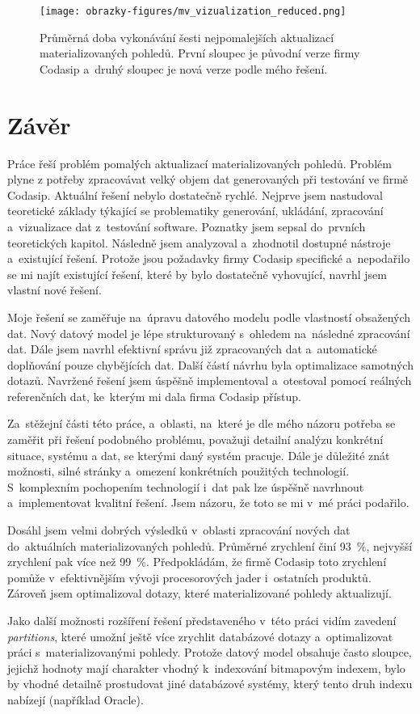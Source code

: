 \begin{figure}[H]
	\centering
	\texttt{[image: obrazky-figures/mv\_vizualization\_reduced.png]}
	\caption{Průměrná doba vykonávání šesti nejpomalejších aktualizací materializovaných pohledů. První sloupec je původní verze firmy Codasip a~druhý sloupec je nová verze podle mého řešení.}
	\label{img:mv_visualization}
\end{figure}


\chapter{Závěr}
\label{chapter:zaver}
Práce řeší problém pomalých aktualizací materializovaných pohledů. Problém plyne z potřeby zpracovávat velký objem dat generovaných při testování ve firmě Codasip. Aktuální řešení nebylo dostatečně rychlé.
Nejprve jsem nastudoval teoretické základy týkající se problematiky generování, ukládání, zpracování a~vizualizace dat z~testování software. Poznatky jsem sepsal do~prvních teoretických kapitol. Následně jsem analyzoval a~zhodnotil dostupné nástroje
a~existující řešení.
Protože jsou požadavky firmy Codasip specifické a~nepodařilo se mi najít existující
řešení, které by bylo dostatečně vyhovující, navrhl jsem vlastní nové řešení.

Moje řešení se zaměřuje na~úpravu datového modelu podle vlastností obsažených dat. Nový datový model je lépe
strukturovaný s~ohledem na~následné zpracování dat. Dále jsem navrhl efektivní správu již zpracovaných dat
a~automatické doplňování pouze chybějících dat. Další částí návrhu byla optimalizace samotných dotazů.
Navržené řešení jsem úspěšně implementoval a~otestoval pomocí reálných referenčních dat, ke~kterým mi dala firma Codasip přístup.

Za~stěžejní části této práce, a~oblasti, na~které je dle mého názoru potřeba se zaměřit při řešení podobného
problému, považuji detailní analýzu konkrétní situace, systému a dat, se kterými daný systém pracuje. Dále je
důležité znát možnosti, silné stránky a~omezení konkrétních použitých technologií. S~komplexním pochopením
technologií i~dat pak lze úspěšně navrhnout a~implementovat kvalitní řešení. Jsem názoru, že toto se mi v~mé
práci podařilo.

Dosáhl jsem velmi dobrých výsledků v~oblasti zpracování nových dat do~aktuálních materializovaných pohledů. Průměrné zrychlení činí 93~\%, nejvyšší zrychlení pak více než 99~\%. Předpokládám, že firmě Codasip toto zrychlení
pomůže v~efektivnějším vývoji procesorových jader i~ostatních produktů. Zároveň jsem optimalizoval dotazy, které materializované pohledy aktualizují.

Jako další možnosti rozšíření řešení představeného v~této práci vidím zavedení
\textit{partitions}, které umožní ještě více zrychlit databázové dotazy a~optimalizovat práci s~materializovanými
pohledy. Protože datový model obsahuje často sloupce, jejichž hodnoty mají charakter vhodný k~indexování bitmapovým
indexem, bylo by vhodné detailně prostudovat jiné databázové systémy, který tento druh indexu nabízejí (například
Oracle).

